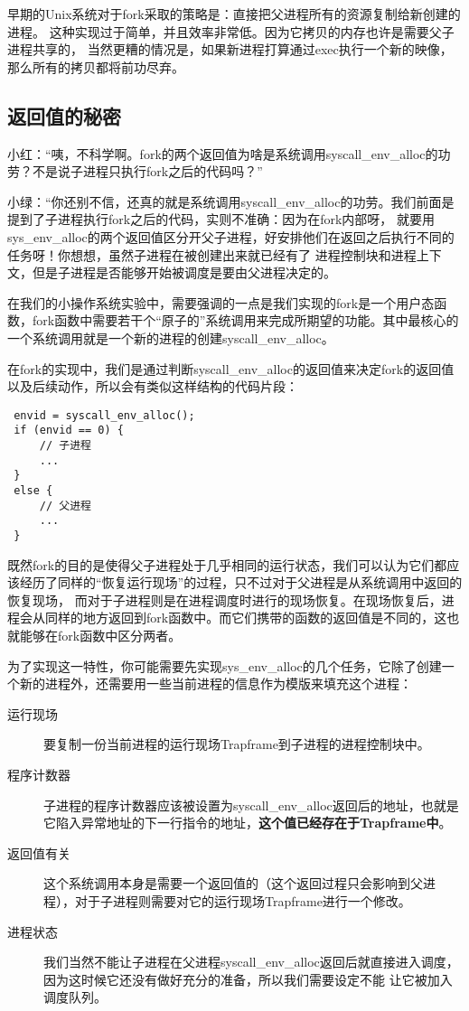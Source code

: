 \begin{note}
早期的Unix系统对于fork采取的策略是：直接把父进程所有的资源复制给新创建的进程。
这种实现过于简单，并且效率非常低。因为它拷贝的内存也许是需要父子进程共享的，
当然更糟的情况是，如果新进程打算通过exec执行一个新的映像，那么所有的拷贝都将前功尽弃。
\end{note}

\subsection{返回值的秘密}

小红：“咦，不科学啊。fork的两个返回值为啥是系统调用syscall\_env\_alloc的功劳？不是说子进程只执行fork之后的代码吗？”

小绿：“你还别不信，还真的就是系统调用syscall\_env\_alloc的功劳。我们前面是提到了子进程执行fork之后的代码，实则不准确：因为在fork内部呀，
就要用sys\_env\_alloc的两个返回值区分开父子进程，好安排他们在返回之后执行不同的任务呀！你想想，虽然子进程在被创建出来就已经有了
进程控制块和进程上下文，但是子进程是否能够开始被调度是要由父进程决定的。

在我们的小操作系统实验中，需要强调的一点是我们实现的fork是一个用户态函数，fork函数中需要若干个“原子的”系统调用来完成所期望的功能。其中最核心的一个系统调用就是一个新的进程的创建syscall\_env\_alloc。

在fork的实现中，我们是通过判断syscall\_env\_alloc的返回值来决定fork的返回值以及后续动作，所以会有类似这样结构的代码片段：
\begin{verbatim}
 envid = syscall_env_alloc();
 if (envid == 0) {
     // 子进程
     ...
 }
 else {
     // 父进程
     ...
 }
\end{verbatim}

既然fork的目的是使得父子进程处于几乎相同的运行状态，我们可以认为它们都应该经历了同样的“恢复运行现场”的过程，只不过对于父进程是从系统调用中返回的恢复现场，
而对于子进程则是在进程调度时进行的现场恢复。在现场恢复后，进程会从同样的地方返回到fork函数中。而它们携带的函数的返回值是不同的，这也就能够在fork函数中区分两者。

为了实现这一特性，你可能需要先实现sys\_env\_alloc的几个任务，它除了创建一个新的进程外，还需要用一些当前进程的信息作为模版来填充这个进程：

\begin{description}
 \item [运行现场] 要复制一份当前进程的运行现场Trapframe到子进程的进程控制块中。
 \item [程序计数器] 子进程的程序计数器应该被设置为syscall\_env\_alloc返回后的地址，也就是它陷入异常地址的下一行指令的地址，\textbf{这个值已经存在于Trapframe中}。
 \item [返回值有关] 这个系统调用本身是需要一个返回值的（这个返回过程只会影响到父进程），对于子进程则需要对它的运行现场Trapframe进行一个修改。
 \item [进程状态] 我们当然不能让子进程在父进程syscall\_env\_alloc返回后就直接进入调度，因为这时候它还没有做好充分的准备，所以我们需要设定不能
 让它被加入调度队列。
 \end{description}

